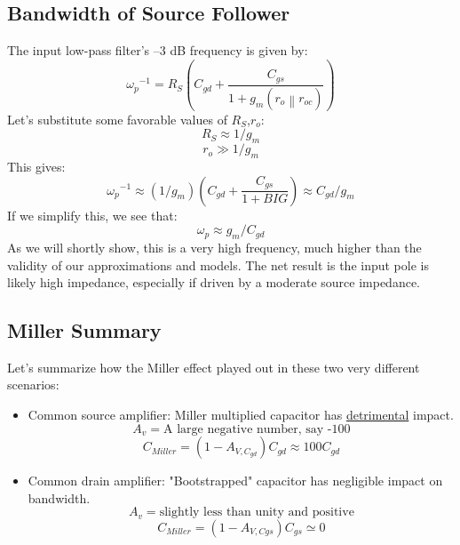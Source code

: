 \subsection{Bandwidth of Source Follower}
The input low-pass filter’s –3 dB frequency is given by:
    \begin{equation} 
        {\omega _p}^{ - 1} = {R_S}\left( {{C_{gd}} + \frac{{{C_{gs}}}}{{1 + {g_m}(\left. {{r_o}} \right\|{r_{oc}})}}} \right)
    \end{equation}
Let's substitute some favorable values of $R_S$,$r_o$:
    \begin{equation} 
        {R_S} \approx 1/{g_m} 
    \end{equation}
    \begin{equation} 
        {r_o} \gg 1/{g_m} 
    \end{equation}
This gives:
    \begin{equation} 
        {\omega _p}^{ - 1} \approx \left( {1/{g_m}} \right)\left( {{C_{gd}} + \frac{{{C_{gs}}}}{{1 + BIG}}} \right) \approx {C_{gd}}/{g_m} 
    \end{equation}
If we simplify this, we see that:
    \begin{equation}
        {\omega _p} \approx {g_m}/{C_{gd}}
    \end{equation}
As we will shortly show, this is a very high frequency, much higher than the validity of our approximations and models.  The net result is the input pole is likely high impedance, especially if driven by a moderate source impedance.
\subsection{Miller Summary}
Let's summarize how the Miller effect played out in these two very different scenarios:
\begin{itemize}
    \item Common source amplifier:  Miller multiplied capacitor has \underline{detrimental} impact.
        \[
        	A_v = \text{A large negative number, say -100} 
        \]
        \[	
        	{C_{Miller}} = (1 - {A_{V,{C_{gd}}}}){C_{gd}} \approx 100{C_{gd}}
        \]
    \item Common drain amplifier:  "Bootstrapped" capacitor has negligible impact on bandwidth.
        \[
        	A_v = \text{slightly less than unity and positive} 
        \]
        \[
        	{C_{Miller}} = (1 - {A_{V,Cgs}}){C_{gs}} \simeq 0
        \]
\end{itemize}
\newpage
